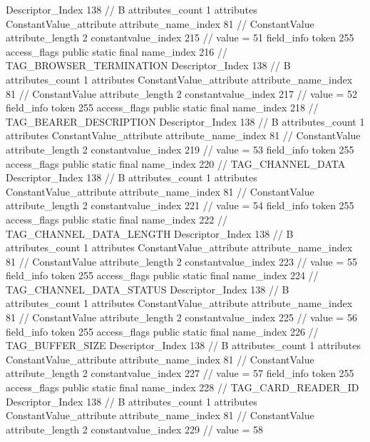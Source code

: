 {{{{{				Descriptor_Index	138		// B
				attributes_count	1
				attributes {
				ConstantValue_attribute {
					attribute_name_index	81		// ConstantValue
					attribute_length	2
					constantvalue_index	215		// value = 51
				}
				}
			}
			field_info {
				token	255
				access_flags	public static final
				name_index	216		// TAG_BROWSER_TERMINATION
				Descriptor_Index	138		// B
				attributes_count	1
				attributes {
				ConstantValue_attribute {
					attribute_name_index	81		// ConstantValue
					attribute_length	2
					constantvalue_index	217		// value = 52
				}
				}
			}
			field_info {
				token	255
				access_flags	public static final
				name_index	218		// TAG_BEARER_DESCRIPTION
				Descriptor_Index	138		// B
				attributes_count	1
				attributes {
				ConstantValue_attribute {
					attribute_name_index	81		// ConstantValue
					attribute_length	2
					constantvalue_index	219		// value = 53
				}
				}
			}
			field_info {
				token	255
				access_flags	public static final
				name_index	220		// TAG_CHANNEL_DATA
				Descriptor_Index	138		// B
				attributes_count	1
				attributes {
				ConstantValue_attribute {
					attribute_name_index	81		// ConstantValue
					attribute_length	2
					constantvalue_index	221		// value = 54
				}
				}
			}
			field_info {
				token	255
				access_flags	public static final
				name_index	222		// TAG_CHANNEL_DATA_LENGTH
				Descriptor_Index	138		// B
				attributes_count	1
				attributes {
				ConstantValue_attribute {
					attribute_name_index	81		// ConstantValue
					attribute_length	2
					constantvalue_index	223		// value = 55
				}
				}
			}
			field_info {
				token	255
				access_flags	public static final
				name_index	224		// TAG_CHANNEL_DATA_STATUS
				Descriptor_Index	138		// B
				attributes_count	1
				attributes {
				ConstantValue_attribute {
					attribute_name_index	81		// ConstantValue
					attribute_length	2
					constantvalue_index	225		// value = 56
				}
				}
			}
			field_info {
				token	255
				access_flags	public static final
				name_index	226		// TAG_BUFFER_SIZE
				Descriptor_Index	138		// B
				attributes_count	1
				attributes {
				ConstantValue_attribute {
					attribute_name_index	81		// ConstantValue
					attribute_length	2
					constantvalue_index	227		// value = 57
				}
				}
			}
			field_info {
				token	255
				access_flags	public static final
				name_index	228		// TAG_CARD_READER_ID
				Descriptor_Index	138		// B
				attributes_count	1
				attributes {
				ConstantValue_attribute {
					attribute_name_index	81		// ConstantValue
					attribute_length	2
					constantvalue_index	229		// value = 58
}}}}}}}
